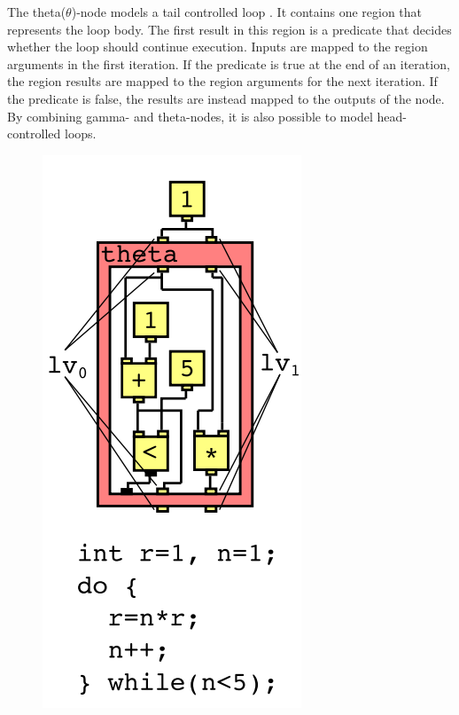 \label{lbl:theta-node}
The theta($\theta$)-node models a tail controlled loop \cite{Reissmann2020}. It contains one region that represents the loop body. The first result in this region is a predicate that decides whether the loop should continue execution. Inputs are mapped to the region arguments in the first iteration. If the predicate is true at the end of an iteration, the region results are mapped to the region arguments for the next iteration. If the predicate is false, the results are instead mapped to the outputs of the node. By combining gamma- and theta-nodes, it is also possible to model head-controlled loops.
\begin{figure}[H]
    \centering
    \includegraphics[width=\textwidth/6]{Images/RVSDG_theta_node.png}

\end{figure}
